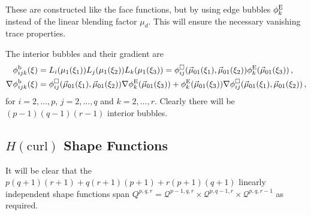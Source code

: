 These are constructed like the face functions, but by using edge bubbles $\phi_k^{\mathrm{E}}$ instead of the linear blending factor $\mu_d$. 
This will ensure the necessary vanishing trace properties.

The interior bubbles and their gradient are
\begin{equation}
	\begin{aligned}
		\phi_{ijk}^\mathrm{b}(\xi)&=L_i(\mu_1(\xi_1))L_j(\mu_1(\xi_2))L_k(\mu_1(\xi_3))
			=\phi_{ij}^\square(\vec{\mu}_{01}(\xi_1),\vec{\mu}_{01}(\xi_2))\phi_k^{\mathrm{E}}(\vec{\mu}_{01}(\xi_3))\,,\\
		\nabla\phi_{ijk}^\mathrm{b}(\xi)&=
			\phi_{ij}^\square(\vec{\mu}_{01}(\xi_1),\vec{\mu}_{01}(\xi_2))\nabla\phi_k^{\mathrm{E}}(\vec{\mu}_{01}(\xi_3))
				+\phi_k^{\mathrm{E}}(\vec{\mu}_{01}(\xi_3))\nabla\phi_{ij}^\square(\vec{\mu}_{01}(\xi_1),\vec{\mu}_{01}(\xi_2))\,,
	\end{aligned}
\end{equation}
for $i=2,\ldots,p$, $j=2,\ldots,q$ and $k=2,\ldots,r$. 
Clearly there will be $(p-1)(q-1)(r-1)$ interior bubbles.



\subsection{\texorpdfstring{$H(\mathrm{curl})$}{Hcurl} Shape Functions}

It will be clear that the $p(q+1)(r+1)+q(r+1)(p+1)+r(p+1)(q+1)$ linearly independent shape functions span $Q^{p,q,r}=\mathcal{Q}^{p-1,q,r}\times\mathcal{Q}^{p,q-1,r}\times\mathcal{Q}^{p,q,r-1}$ as required.

